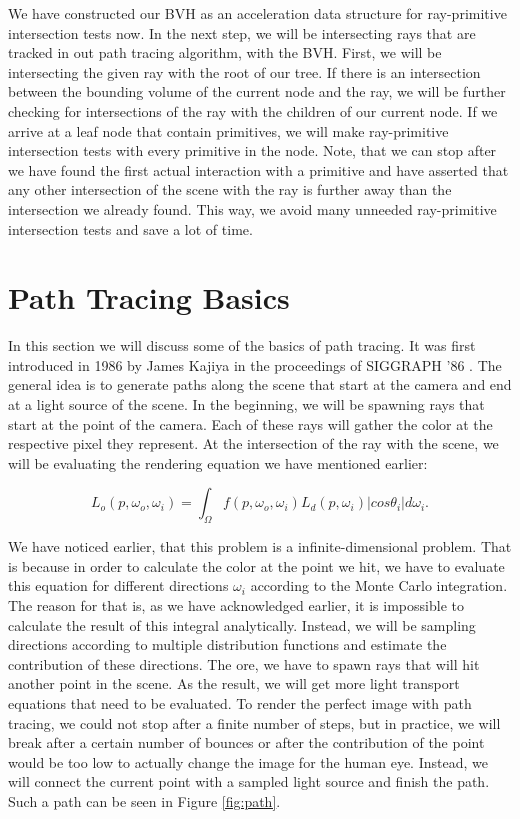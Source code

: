 We have constructed our BVH as an acceleration data structure for ray-primitive intersection tests now. In the next step, we will be intersecting rays that are tracked in out path tracing algorithm, with the BVH. First, we will be intersecting the given ray with the root of our tree. If there is an intersection between the bounding volume of the current node and the ray, we will be further checking for intersections of the ray with the children of our current node. If we arrive at a leaf node that contain primitives, we will make ray-primitive intersection tests with every primitive in the node. Note, that we can stop after we have found the first actual interaction with a primitive and have asserted that any other intersection of the scene with the ray is further away than the intersection we already found.  This way, we avoid many unneeded ray-primitive intersection tests 
and save a lot of time.

\section{Path Tracing Basics}
\label{sec:preliminaries:pat}

In this section we will discuss some of the basics of path tracing. It was first introduced in 1986 by James Kajiya in the proceedings of SIGGRAPH '86 \cite{JTK}. The general idea is to generate paths along the scene that start at the camera and end at a light source of the scene. In the beginning, we will be spawning rays that start at the point of the camera. Each of these rays will gather the color at the respective pixel they represent. At the intersection of the ray with the scene, we will be evaluating the rendering equation we have mentioned earlier:

\begin{equation}
L_o(p, \omega_o, \omega_i) = \int_{\Omega}f(p, \omega_o, \omega_i)L_d(p, \omega_i)|cos\theta_i|d\omega_i.
\end{equation}

We have noticed earlier, that this problem is a infinite-dimensional problem. That is because in order to calculate the color at the point we hit, we have to evaluate this equation for different directions $\omega_i$ according to the Monte Carlo integration. The reason for that is, as we have acknowledged earlier, it is impossible to calculate the result of this integral analytically. Instead, we will be sampling directions according to multiple distribution functions and estimate the contribution of these directions. The
ore, we have to spawn rays that will hit another point in the scene. As the result, we will get more light transport equations that need to be evaluated. To render the perfect image with path tracing, we could not stop after a finite number of steps, but in practice, we will break after a certain number of bounces or after the contribution of the point would be too low to actually change the image for the human eye. Instead, we will connect the current point with a sampled light source and finish the path. Such a path can be seen in Figure \ref{fig:path}.

